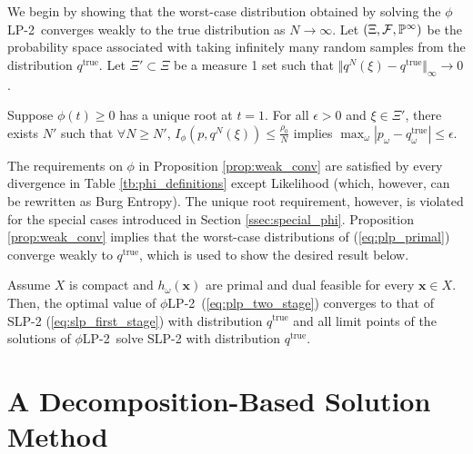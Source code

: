 \documentclass[ijoc,letterpaper]{informs3} %
\renewcommand{\P}{\mathbb{P}}
\newcommand{\x}{\mathbf{x}}
\newcommand{\qtrue}{q^{\text{true}}}
\newcommand{\plp}{$\phi$LP-2}
\begin{document}
We begin by showing that the worst-case distribution obtained by solving the \plp\ converges weakly to the true distribution as $N \rightarrow \infty$.
Let $(\Xi,{\cal F},\P^\infty)$ be the probability space associated with taking infinitely many random samples from the distribution $\qtrue$.
Let $\Xi' \subset \Xi$ be a measure 1 set such that $\Vert q^N(\xi) - \qtrue \Vert_\infty \rightarrow 0$.

\begin{proposition} \label{prop:weak_conv}
	Suppose $\phi(t) \geq 0$ has a unique root at $t = 1$.
	For all $\epsilon > 0$ and $\xi \in \Xi'$, there exists $N'$ such that $\forall N \geq N'$, $I_{\phi}(p,q^N(\xi)) \leq \frac{\rho_0}{N}$ implies $\max_\omega |p_\omega - \qtrue_\omega| \leq \epsilon$.
\end{proposition}

The requirements on $\phi$ in Proposition \ref{prop:weak_conv} are satisfied by every divergence in Table \ref{tb:phi_definitions} except Likelihood (which, however, can be rewritten as Burg Entropy).
The unique root requirement, however, is violated for the special cases introduced in Section \ref{ssec:special_phi}.
Proposition \ref{prop:weak_conv} implies that the worst-case distributions of (\ref{eq:plp_primal}) converge weakly to $\qtrue$, which is used to show the desired result below. 
\begin{theorem}
	\label{thm:epiconvergence}
	Assume $X$ is compact and $h_\omega(\x)$ are primal and dual feasible for every $\x \in X$.
	Then, the optimal value of \plp\ (\ref{eq:plp_two_stage}) converges to that of SLP-2 (\ref{eq:slp_first_stage}) with distribution $\qtrue$ and all limit points of the solutions of \plp\ solve SLP-2 with distribution $\qtrue$.
\end{theorem}

\section{A Decomposition-Based Solution Method}
\label{sec:soln_algorithm}
\end{document}
